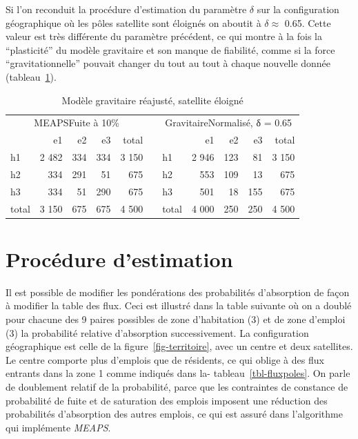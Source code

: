 \documentclass[
  10pt,
  a4paper,
  numbers=noendperiod,
  DIV=9]{scrartcl}
\begin{document}
Si l'on reconduit la procédure d'estimation du paramètre \(\delta\) sur
la configuration géographique où les pôles satellite sont éloignés on
aboutit à \(\delta \approx\) 0.65. Cette valeur est très différente du
paramètre précédent, ce qui montre à la fois la ``plasticité'' du modèle
gravitaire et son manque de fiabilité, comme si la force
``gravitationnelle'' pouvait changer du tout au tout à chaque nouvelle
donnée (tableau~\ref{tbl-fluxgrav3}).

\hypertarget{tbl-fluxgrav3}{}
\begin{longtable}{lrrrrrlrrrr}
\caption{\label{tbl-fluxgrav3}Modèle gravitaire réajusté, satellite éloigné }\tabularnewline

\toprule
\multicolumn{5}{c}{MEAPSFuite à 10\%} &  & \multicolumn{5}{c}{GravitaireNormalisé, δ = 0.65} \\ 
\cmidrule(lr){1-5} \cmidrule(lr){7-11}
 & e1 & e2 & e3 & total &   &  & e1 & e2 & e3 & total \\ 
\midrule
h1 & 2 482 & 334 & 334 & 3 150 &  & h1 & 2 946 & 123 & 81 & 3 150 \\ 
h2 & 334 & 291 & 51 & 675 &  & h2 & 553 & 109 & 13 & 675 \\ 
h3 & 334 & 51 & 290 & 675 &  & h3 & 501 & 18 & 155 & 675 \\ 
total & 3 150 & 675 & 675 & 4 500 &  & total & 4 000 & 250 & 250 & 4 500 \\ 
\bottomrule
\end{longtable}

\hypertarget{sec-estimation}{%
\section{Procédure d'estimation}\label{sec-estimation}}

Il est possible de modifier les pondérations des probabilités
d'absorption de façon à modifier la table des flux. Ceci est illustré
dans la table suivante où on a doublé pour chacune des 9 paires
possibles de zone d'habitation (3) et de zone d'emploi (3) la
probabilité relative d'absorption successivement. La configuration
géographique est celle de la figure~\ref{fig-territoire}, avec un centre
et deux satellites. Le centre comporte plus d'emplois que de résidents,
ce qui oblige à des flux entrants dans la zone 1 comme indiqués dans la-
tableau~\ref{tbl-fluxpoles}. On parle de doublement relatif de la
probabilité, parce que les contraintes de constance de probabilité de
fuite et de saturation des emplois imposent une réduction des
probabilités d'absorption des autres emplois, ce qui est assuré dans
l'algorithme qui implémente \emph{MEAPS}.
\end{document}
